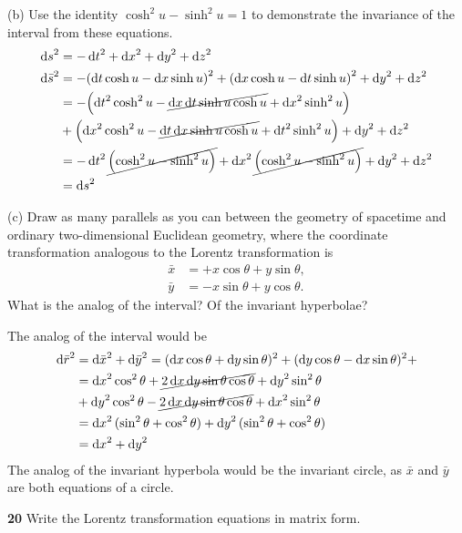 \documentclass[gr-notes.tex]{subfiles}
\begin{document}
(b) Use the identity $\cosh^2 u - \sinh^2 u = 1$ to demonstrate the invariance of the interval from these equations.
%
\begin{align*}
  \dd{s}^2 &= -\dd{t}^2 + \dd{x}^2 + \dd{y}^2 + \dd{z}^2
  \\
  \dd{\bar{s}}^2 &=
  -\qty(\dd{t} \cosh u - \dd{x} \sinh u)^2
  +\qty(\dd{x} \cosh u - \dd{t} \sinh u)^2
  + \dd{y}^2 + \dd{z}^2
  \\ &=
  -\qty(\dd{t}^2 \cosh^2 u -
        \cancel{\dd{x} \dd{t} \sinh u \cosh u} +
        \dd{x}^2 \sinh^2 u)
  \\ &+
  \qty(\dd{x}^2 \cosh^2 u -
        \cancel{\dd{t} \dd{x} \sinh u \cosh u} +
        \dd{t}^2 \sinh^2 u)
  + \dd{y}^2 + \dd{z}^2
  \\ &=
  -\dd{t}^2 \cancel{\qty(\cosh^2 u - \sinh^2 u)} +
  \dd{x}^2 \cancel{\qty(\cosh^2 u - \sinh^2 u)}
  + \dd{y}^2 + \dd{z}^2
  \\ &=
  \dd{s}^2
\end{align*}

(c) Draw as many parallels as you can between the geometry of spacetime and ordinary two-dimensional Euclidean geometry, where the coordinate transformation analogous to the Lorentz transformation is
%
\begin{align*}
  \bar{x} &= +x \cos\theta + y \sin\theta,
  \\
  \bar{y} &= -x \sin\theta + y \cos\theta.
\end{align*}
%
What is the analog of the interval? Of the invariant hyperbolae?

The analog of the interval would be
%
\begin{align*}
  \dd{\bar{r}}^2 &=
  \dd{\bar{x}}^2 + \dd{\bar{y}}^2 =
  (\dd{x} \cos\theta + \dd{y} \sin\theta)^2 +
  (\dd{y} \cos\theta - \dd{x} \sin\theta)^2 +
  \\ &=
  \dd{x}^2 \cos^2 \theta +
  \cancel{2 \dd{x} \dd{y} \sin\theta \cos\theta} +
  \dd{y}^2 \sin^2 \theta
  \\ &+
  \dd{y}^2 \cos^2 \theta -
  \cancel{2 \dd{x} \dd{y} \sin\theta \cos\theta} +
  \dd{x}^2 \sin^2 \theta
  \\ &=
  \dd{x}^2 (\sin^2 \theta + \cos^2 \theta) +
  \dd{y}^2 (\sin^2 \theta + \cos^2 \theta)
  \\ &=
  \dd{x}^2 + \dd{y}^2
\end{align*}
%
The analog of the invariant hyperbola would be the invariant circle, as $\bar{x}$ and $\bar{y}$ are both equations of a circle.


\textbf{20}
Write the Lorentz transformation equations in matrix form.
\end{document}
